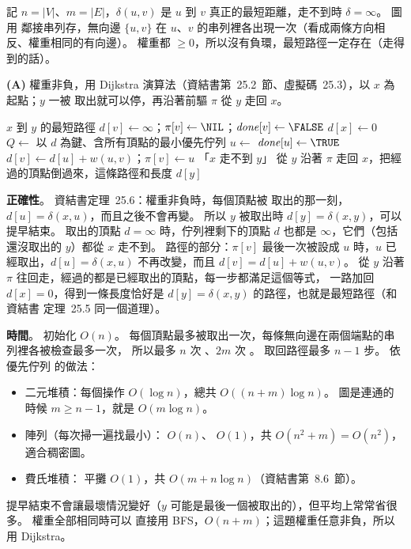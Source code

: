 \begin{pastsoln}
記 $n = |V|$、$m = |E|$，$\delta(u, v)$ 是 $u$ 到 $v$ 真正的最短距離，走不到時 $\delta = \infty$。 圖用
鄰接串列存，無向邊 $\{u, v\}$ 在 $u$、$v$ 的串列裡各出現一次（看成兩條方向相反、權重相同的有向邊）。
權重都 $\ge 0$，所以沒有負環，最短路徑一定存在（走得到的話）。

\textbf{(A)} 權重非負，用 Dijkstra 演算法（資結書第~25.2~節、虛擬碼~25.3），以 $x$ 為起點；$y$ 一被
取出就可以停，再沿著前驅 $\pi$ 從 $y$ 走回 $x$。
\begin{pseudo}{$x$ 到 $y$ 的最短路徑}
        \State $d[v] \gets \infty$；$\pi[v] \gets \NIL$；$\mathit{done}[v] \gets \FALSE$
    \EndFor
    \State $d[x] \gets 0$
    \State $Q \gets$ 以 $d$ 為鍵、含所有頂點的最小優先佇列
        \State $u \gets$ 
            \State \Break {}
        \EndIf
        \State $\mathit{done}[u] \gets \TRUE$
                \State $d[v] \gets d[u] + w(u, v)$；$\pi[v] \gets u$
                \State {}
            \EndIf
        \EndFor
    \EndWhile
        \State \Return 「$x$ 走不到 $y$」
    \EndIf
    \State 從 $y$ 沿著 $\pi$ 走回 $x$，把經過的頂點倒過來，\Return 這條路徑和長度 $d[y]$
\EndFunction
\end{pseudo}

\textbf{正確性}。 資結書定理~25.6：權重非負時，每個頂點被  取出的那一刻，$d[u] =
\delta(x, u)$，而且之後不會再變。 所以 $y$ 被取出時 $d[y] = \delta(x, y)$，可以提早結束。 取出的頂點
$d = \infty$ 時，佇列裡剩下的頂點 $d$ 也都是 $\infty$，它們（包括還沒取出的 $y$）都從 $x$ 走不到。
路徑的部分：$\pi[v]$ 最後一次被設成 $u$ 時，$u$ 已經取出，$d[u] = \delta(x, u)$ 不再改變，而且
$d[v] = d[u] + w(u, v)$。 從 $y$ 沿著 $\pi$ 往回走，經過的都是已經取出的頂點，每一步都滿足這個等式，
一路加回 $d[x] = 0$，得到一條長度恰好是 $d[y] = \delta(x, y)$ 的路徑，也就是最短路徑（和資結書
定理~25.5 同一個道理）。

\textbf{時間}。 初始化 $O(n)$。 每個頂點最多被取出一次，每條無向邊在兩個端點的串列裡各被檢查最多一次，
所以最多 $n$ 次 、$2m$ 次 。 取回路徑最多 $n - 1$ 步。 依優先佇列
的做法：
\begin{itemize}
\item 二元堆積：每個操作 $O(\log n)$，總共 $O((n + m)\log n)$。 圖是連通的時候 $m \ge n - 1$，就是
$O(m \log n)$。
\item 陣列（每次掃一遍找最小）： $O(n)$、 $O(1)$，共 $O(n^2 + m) =
O(n^2)$，適合稠密圖。
\item 費氏堆積： 平攤 $O(1)$，共 $O(m + n \log n)$（資結書第~8.6~節）。
\end{itemize}
提早結束不會讓最壞情況變好（$y$ 可能是最後一個被取出的），但平均上常常省很多。 權重全部相同時可以
直接用 BFS，$O(n + m)$；這題權重任意非負，所以用 Dijkstra。


\end{pastsoln}
